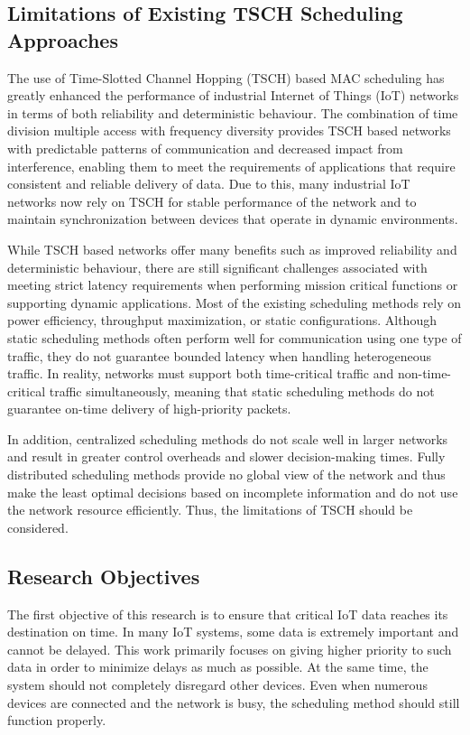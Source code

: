 \documentclass[a4paper,fleqn]{cas-dc}
\numberwithin{equation}{section}
\begin{document}
\subsection{Limitations of Existing TSCH Scheduling Approaches}

The use of Time-Slotted Channel Hopping (TSCH) based MAC scheduling has greatly enhanced the performance of industrial Internet of Things (IoT) networks in terms of both reliability and deterministic behaviour. The combination of time division multiple access with frequency diversity provides TSCH based networks with predictable patterns of communication and decreased impact from interference, enabling them to meet the requirements of applications that require consistent and reliable delivery of data. Due to this, many industrial IoT networks now rely on TSCH for stable performance of the network and to maintain synchronization between devices that operate in dynamic environments.

While TSCH based networks offer many benefits such as improved reliability and deterministic behaviour, there are still significant challenges associated with meeting strict latency requirements when performing mission critical functions or supporting dynamic applications. Most of the existing scheduling methods rely on power efficiency, throughput maximization, or static configurations. Although static scheduling methods often perform well for communication using one type of traffic, they do not guarantee bounded latency when handling heterogeneous traffic. In reality, networks must support both time-critical traffic and non-time-critical traffic simultaneously, meaning that static scheduling methods do not guarantee on-time delivery of high-priority packets.

In addition, centralized scheduling methods do not scale well in larger networks and result in greater control overheads and slower decision-making times. Fully distributed scheduling methods provide no global view of the network and thus make the least optimal decisions based on incomplete information and do not use the network resource efficiently. Thus, the limitations of TSCH should be considered.


\subsection{Research Objectives}
The first objective of this research is to ensure that critical IoT data reaches its destination on time. In many IoT systems, some data is extremely important and cannot be delayed. This work primarily focuses on giving higher priority to such data in order to minimize delays as much as possible. At the same time, the system should not completely disregard other devices. Even when numerous devices are connected and the network is busy, the scheduling method should still function properly.
\end{document}
